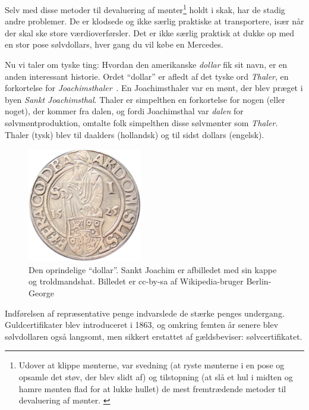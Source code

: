 \documentclass[paper=6in:9in,pagesize=pdftex,
               headinclude=on,footinclude=on,12pt]{scrbook}
\begin{document}
Selv med disse metoder til devaluering af mønter\footnote{Udover at klippe mønterne, var svedning (at ryste mønterne i en pose og opsamle det støv, der blev slidt af) og tilstopning (at slå et hul i midten og hamre mønten flad for at lukke hullet) de mest fremtrædende metoder til devaluering af mønter. \cite{wiki:coin-debasement}} holdt i skak, har de stadig andre problemer. De er klodsede og ikke særlig praktiske at transportere, især når der skal ske store værdioverførsler. Det er ikke særlig praktisk at dukke op med en stor pose sølvdollars, hver gang du vil købe en Mercedes.

Nu vi taler om tyske ting: Hvordan den amerikanske \textit{dollar} fik sit navn, er en anden interessant historie. Ordet \enquote{dollar} er afledt af det tyske ord \textit{Thaler}, en forkortelse for \textit{Joachimsthaler}~\cite{wiki:thaler}. En Joachimsthaler var en mønt, der blev præget i byen \textit{Sankt Joachimsthal}. Thaler er simpelthen en forkortelse for nogen (eller noget), der kommer fra dalen, og fordi Joachimsthal var \textit{dalen} for sølvmøntproduktion, omtalte folk simpelthen disse sølvmønter som \textit{Thaler.} Thaler (tysk) blev til daalders (hollandsk) og til sidst dollars (engelsk).\begin{figure}
  \centering
  \includegraphics[width=5cm]{assets/images/joachimsthaler.png}
  \caption{Den oprindelige \enquote{dollar}. Sankt Joachim er afbilledet med sin kappe og troldmandshat. Billedet er cc-by-sa af Wikipedia-bruger Berlin-George}
  \label{fig:joachimsthaler}
\end{figure}

Indførelsen af repræsentative penge indvarslede de stærke penges undergang. Guldcertifikater blev introduceret i 1863, og omkring femten år senere blev sølvdollaren også langsomt, men sikkert erstattet af gældsbeviser: sølvcertifikatet. \cite{wiki:silver-certificate}
\end{document}

